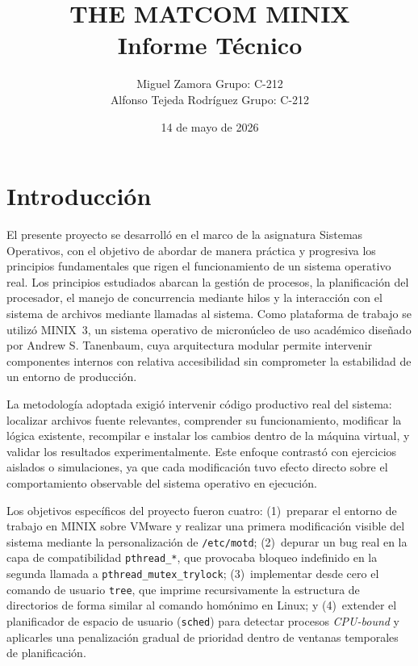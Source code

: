 \documentclass[11pt,a4paper]{article}
\title{THE MATCOM MINIX\\\large Informe T\'ecnico}
\author{
Miguel Zamora \quad Grupo: C-212\\
Alfonso Tejeda Rodr\'iguez \quad Grupo: C-212
}
\date{14 de mayo de 2026}
\begin{document}
\maketitle
\tableofcontents
\newpage

\section{Introducci\'on}

El presente proyecto se desarroll\'o en el marco de la asignatura Sistemas Operativos, con el objetivo de abordar de manera pr\'actica y progresiva los principios fundamentales que rigen el funcionamiento de un sistema operativo real. Los principios estudiados abarcan la gesti\'on de procesos, la planificaci\'on del procesador, el manejo de concurrencia mediante hilos y la interacci\'on con el sistema de archivos mediante llamadas al sistema. Como plataforma de trabajo se utiliz\'o MINIX~3, un sistema operativo de micron\'ucleo de uso acad\'emico dise\~nado por Andrew S. Tanenbaum, cuya arquitectura modular permite intervenir componentes internos con relativa accesibilidad sin comprometer la estabilidad de un entorno de producci\'on.

La metodolog\'ia adoptada exigi\'o intervenir c\'odigo productivo real del sistema: localizar archivos fuente relevantes, comprender su funcionamiento, modificar la l\'ogica existente, recompilar e instalar los cambios dentro de la m\'aquina virtual, y validar los resultados experimentalmente. Este enfoque contrast\'o con ejercicios aislados o simulaciones, ya que cada modificaci\'on tuvo efecto directo sobre el comportamiento observable del sistema operativo en ejecuci\'on.

Los objetivos espec\'ificos del proyecto fueron cuatro: (1)~preparar el entorno de trabajo en MINIX sobre VMware y realizar una primera modificaci\'on visible del sistema mediante la personalizaci\'on de \texttt{/etc/motd}; (2)~depurar un bug real en la capa de compatibilidad \texttt{pthread\_*}, que provocaba bloqueo indefinido en la segunda llamada a \texttt{pthread\_mutex\_trylock}; (3)~implementar desde cero el comando de usuario \texttt{tree}, que imprime recursivamente la estructura de directorios de forma similar al comando hom\'onimo en Linux; y (4)~extender el planificador de espacio de usuario (\texttt{sched}) para detectar procesos \emph{CPU-bound} y aplicarles una penalizaci\'on gradual de prioridad dentro de ventanas temporales de planificaci\'on.
\end{document}
